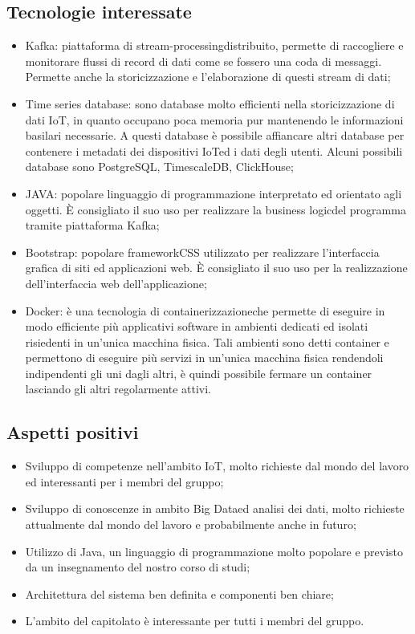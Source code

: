 \subsection{Tecnologie interessate}
\begin{itemize}
	\item Kafka\glosp: piattaforma di stream-processing\glosp distribuito, permette di raccogliere e monitorare flussi di record di dati come se fossero una coda di messaggi. Permette anche la storicizzazione e l'elaborazione di questi stream di dati;
	\item Time series database\glosp: sono database molto efficienti nella storicizzazione di dati IoT\glo, in quanto occupano poca memoria pur mantenendo le informazioni basilari necessarie. A questi database è possibile affiancare altri database per contenere i metadati dei dispositivi IoT\glosp ed i dati degli utenti. Alcuni possibili database sono PostgreSQL\glo, TimescaleDB\glo, ClickHouse\glo;
	\item JAVA\glosp: popolare linguaggio di programmazione interpretato ed orientato agli oggetti. È consigliato il suo uso per realizzare la business logic\glosp del programma tramite piattaforma Kafka\glo;
	\item Bootstrap\glosp: popolare framework\glosp CSS utilizzato per realizzare l'interfaccia grafica di siti ed applicazioni web. È consigliato il suo uso per la realizzazione dell'interfaccia web dell'applicazione;
	\item Docker\glosp: è una tecnologia di containerizzazione\glosp che permette di eseguire in modo efficiente più applicativi software in ambienti dedicati ed isolati risiedenti in un'unica macchina fisica. Tali ambienti sono detti container e permettono di eseguire più servizi in un'unica macchina fisica rendendoli indipendenti gli uni dagli altri, è quindi possibile fermare un container lasciando gli altri regolarmente attivi.
\end{itemize} 
\subsection{Aspetti positivi}
\begin{itemize} 
	\item Sviluppo di competenze nell'ambito IoT\glo, molto richieste dal mondo del lavoro ed interessanti per i membri del gruppo;
	\item Sviluppo di conoscenze in ambito Big Data\glosp ed analisi dei dati, molto richieste attualmente dal mondo del lavoro e probabilmente anche in futuro;
	\item Utilizzo di Java, un linguaggio di programmazione molto popolare e previsto da un insegnamento del nostro corso di studi;
	\item Architettura del sistema ben definita e componenti ben chiare;
	\item L'ambito del capitolato è interessante per tutti i membri del gruppo.
\end{itemize}
